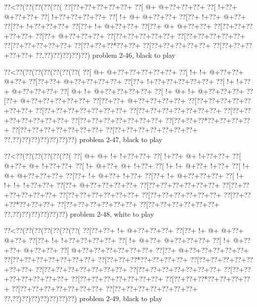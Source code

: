 \vbox{\vbox{\goo
\0??<\0??(\0??(\0??(\0??(\0??(
\0??[\0??+\0??+\0??+\0??+\0??+
\0??[\- @+\- @+\0??+\0??+\0??+
\0??[\- !+\0??+\- @+\0??+\0??+
\0??[\- !+\0??+\0??+\0??+\0??+
\0??[\- !+\- @+\- @+\0??+\0??+
\0??[\0??+\- !+\0??+\- @+\0??+
\0??[\0??+\- !+\0??+\0??+\0??+
\0??[\0??+\- !+\- @+\0??+\0??+
\0??[\0??+\- @+\- @+\0??+\0??+
\0??[\0??+\0??+\0??+\0??+\0??+
\0??[\0??+\- @+\0??+\0??+\0??+
\0??[\0??+\0??+\0??+\0??+\0??+
\0??[\0??+\0??+\0??+\0??+\0??+
\0??[\0??+\0??+\0??+\0??+\0??+
\0??[\0??+\0??+\0??*\0??+\0??+
\0??[\0??+\0??+\0??+\0??+\0??+
\0??[\0??+\0??+\0??+\0??+\0??+
\0??,\0??)\0??)\0??)\0??)\0??)
}
\hfil problem 2-46, black to play\hfil\break
}

\vbox{\vbox{\goo
\0??<\0??(\0??(\0??(\0??(\0??(\0??(\0??(
\0??[\- @+\- @+\0??+\0??+\0??+\0??+\0??+
\0??[\- !+\- !+\- @+\0??+\0??+\- @+\0??+
\0??[\0??+\0??+\- @+\0??+\0??+\0??+\0??+
\0??[\0??+\- !+\0??+\0??+\0??+\0??+\0??+
\0??[\- !+\- !+\0??+\- @+\0??+\0??+\0??+
\0??[\- @+\- !+\- @+\0??+\0??+\0??+\0??+
\0??[\- !+\- @+\- !+\- @+\0??+\0??+\0??+
\0??[\0??+\- @+\0??+\0??+\0??+\0??+\0??+
\0??[\0??+\0??+\- @+\0??+\0??+\0??+\0??+
\0??[\0??+\0??+\0??+\0??+\0??+\0??+\0??+
\0??[\0??+\0??+\0??+\0??+\0??+\0??+\0??+
\0??[\0??+\0??+\0??+\0??+\0??+\0??+\0??+
\0??[\0??+\0??+\0??+\0??+\0??+\0??+\0??+
\0??[\0??+\0??+\0??+\0??+\0??+\0??+\0??+
\0??[\0??+\0??+\0??*\0??+\0??+\0??+\0??+
\0??[\0??+\0??+\0??+\0??+\0??+\0??+\0??+
\0??[\0??+\0??+\0??+\0??+\0??+\0??+\0??+
\0??,\0??)\0??)\0??)\0??)\0??)\0??)\0??)
}
\hfil problem 2-47, black to play\hfil\break
}

\vbox{\vbox{\goo
\0??<\0??(\0??(\0??(\0??(\0??(\0??(
\0??[\- @+\- @+\- !+\- !+\0??+\0??+
\0??[\- !+\0??+\- @+\- !+\0??+\0??+
\0??[\- @+\0??+\- @+\- !+\0??+\0??+
\0??[\- !+\- @+\0??+\- @+\- !+\0??+
\0??[\- !+\- !+\- @+\0??+\- !+\0??+
\0??[\- !+\- @+\- @+\0??+\0??+\0??+
\0??[\0??+\- !+\- @+\0??+\- !+\0??+
\0??[\0??+\- !+\- @+\0??+\0??+\0??+
\0??[\- !+\- !+\- !+\- !+\0??+\0??+
\0??[\0??+\- @+\0??+\0??+\0??+\0??+
\0??[\0??+\0??+\0??+\0??+\0??+\0??+
\0??[\0??+\0??+\0??+\0??+\0??+\0??+
\0??[\0??+\0??+\0??+\0??+\0??+\0??+
\0??[\0??+\0??+\0??+\0??+\0??+\0??+
\0??[\0??+\0??+\0??*\0??+\0??+\0??+
\0??[\0??+\0??+\0??+\0??+\0??+\0??+
\0??[\0??+\0??+\0??+\0??+\0??+\0??+
\0??,\0??)\0??)\0??)\0??)\0??)\0??)
}
\hfil problem 2-48, white to play\hfil\break
}

\vbox{\vbox{\goo
\0??<\0??(\0??(\0??(\0??(\0??(\0??(\0??(
\0??[\0??+\0??+\- !+\- @+\0??+\0??+\0??+
\0??[\0??+\- !+\- @+\- @+\0??+\- @+\0??+
\0??[\0??+\- !+\- !+\0??+\0??+\0??+\0??+
\0??[\- !+\- @+\0??+\- @+\0??+\0??+\0??+
\0??[\- !+\- @+\0??+\0??+\- @+\0??+\0??+
\0??[\- @+\0??+\0??+\0??+\0??+\0??+\0??+
\0??[\0??+\- @+\0??+\0??+\0??+\0??+\0??+
\0??[\0??+\0??+\0??+\0??+\0??+\0??+\0??+
\0??[\0??+\0??+\0??*\0??+\0??+\0??+\0??+
\0??[\0??+\0??+\0??+\0??+\0??+\0??+\0??+
\0??[\0??+\0??+\0??+\0??+\0??+\0??+\0??+
\0??[\0??+\0??+\0??+\0??+\0??+\0??+\0??+
\0??[\0??+\0??+\0??+\0??+\0??+\0??+\0??+
\0??[\0??+\0??+\0??+\0??+\0??+\0??+\0??+
\0??[\0??+\0??+\0??*\0??+\0??+\0??+\0??+
\0??[\0??+\0??+\0??+\0??+\0??+\0??+\0??+
\0??[\0??+\0??+\0??+\0??+\0??+\0??+\0??+
\0??,\0??)\0??)\0??)\0??)\0??)\0??)\0??)
}
\hfil problem 2-49, black to play\hfil\break
}

